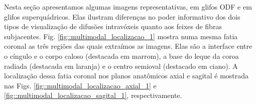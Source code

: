 Nesta seção apresentamos algumas imagens representativas, em glifos ODF e em glifos superquádricos. Elas ilustram diferenças no poder informativo dos dois tipos de visualização de difusões intravóxeis quanto aos feixes de fibras subjacentes. Fig.  \ref{fig::multimodal_localizacao_1} mostra numa mesma fatia coronal as três regiões das quais extraímos as imagens.
Elas são a interface entre o cíngulo e o corpo caloso (destacada em marrom), a base do leque da coroa radiada (destacada em laranja) e o centro semioval (destacado em ciano). A localização dessa fatia coronal nos planos anatômicos axial e sagital é mostrada nas Figs. \ref{fig::multimodal_localizacao_axial_1} e  \ref{fig::multimodal_localizacao_sagital_1}, respectivamente.%
